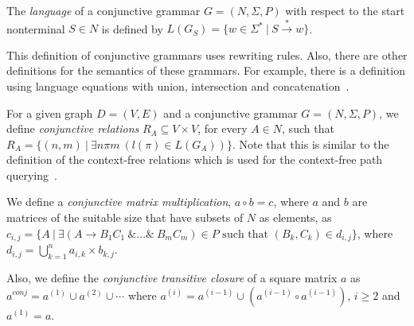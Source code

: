 The \textit{language} of a conjunctive grammar $G = (N,\Sigma,P)$ with respect to the start nonterminal $S \in N$ is defined by $L(G_S) = \{w \in \Sigma^*~|~S \xrightarrow{*} w\}$.

This definition of conjunctive grammars uses rewriting rules. Also, there are other definitions for the semantics of these grammars. For example, there is a definition using language equations with union, intersection and concatenation~\cite{okhotin2001conjunctive}.

For a given graph $D = (V, E)$ and a conjunctive grammar $G = (N, \Sigma, P)$, we define \textit{conjunctive relations} $R_A \subseteq V \times V$, for every $A \in N$, such that $R_A = \{(n,m)~|~\exists n \pi m~(l(\pi) \in L(G_A))\}$. Note that this is similar to the definition of the context-free relations which is used for the context-free path querying~\cite{hellingsRelational}.

We define a \textit{conjunctive matrix multiplication}, $a \circ b = c$, where $a$ and $b$ are matrices of the suitable size that have subsets of $N$ as elements, as $c_{i,j} = \{A~|~\exists (A \rightarrow B_1 C_1~\& \ldots \&~B_m C_m) \in P \text{ such that } (B_k, C_k) \in d_{i,j} \}$, where $d_{i,j} = \bigcup^{n}_{k=1}{a_{i,k} \times b_{k,j}}$. 

Also, we define the \textit{conjunctive transitive closure} of a square matrix $a$ as $a^{conj} = a^{(1)} \cup a^{(2)} \cup \cdots$ where $a^{(i)} = a^{(i-1)} \cup (a^{(i-1)} \circ a^{(i-1)})$, $i \ge 2$ and $a^{(1)} = a$.
